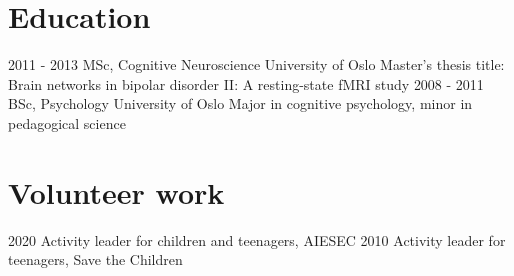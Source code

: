 \documentclass[letterpaper]{twentyonesecondcv} %
\begin{document}
{    \section{Education}
    
    \begin{twenty}
      \twentyitem
        {2011 - 2013}
        {MSc, Cognitive Neuroscience}
        {University of Oslo}
        {Master's thesis title: Brain networks in bipolar disorder II: A resting-state fMRI study}
    \twentyitem
        {2008 - 2011}
        {BSc, Psychology}
        {University of Oslo}
        {Major in cognitive psychology, minor in pedagogical science}
    \end{twenty}
    
    \section{Volunteer work}
    
    \begin{twentyshort}
      \twentyitemshort
        {2020}
        {Activity leader for children and teenagers, AIESEC}
      \twentyitemshort
        {2010}
        {Activity leader for teenagers, Save the Children}
    \end{twentyshort}

}
\end{document}
